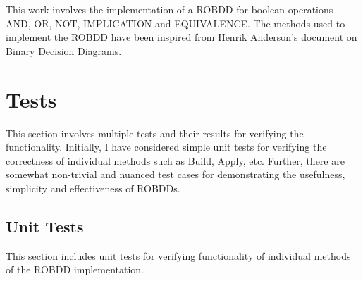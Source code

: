 \documentclass[a4paper, titlepage, 12pt]{article}
\numberwithin{equation}{section}
\begin{document}
        This work involves the implementation of a ROBDD for boolean operations AND, OR, NOT, IMPLICATION and EQUIVALENCE.
        The methods used to implement the ROBDD have been inspired from Henrik Anderson's document on Binary Decision Diagrams.

    \section{Tests}

        This section involves multiple tests and their results for verifying the functionality.
        Initially, I have considered simple unit tests for verifying the correctness of individual methods such as Build, Apply, etc. 
        Further, there are somewhat non-trivial and nuanced test cases for demonstrating the usefulness, simplicity and effectiveness of ROBDDs.

        \subsection{Unit Tests}

            This section includes unit tests for verifying functionality of individual methods of the ROBDD implementation.
\end{document}
